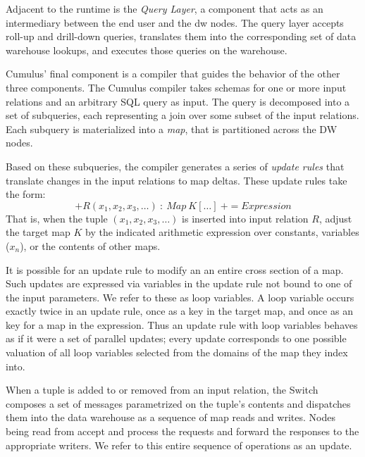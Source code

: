 \documentclass{sig-alternate}
\begin{document}
Adjacent to the runtime is the \textit{Query Layer}, a component that acts as an intermediary between the end user and the dw nodes.  The query layer accepts roll-up and drill-down queries, translates them into the corresponding set of data warehouse lookups, and executes those queries on the warehouse.

Cumulus' final component is a compiler that guides the behavior of the other three components.  The Cumulus compiler takes schemas for one or more input relations and an arbitrary SQL query as input.  The query is decomposed into a set of subqueries, each representing a join over some subset of the input relations.  Each subquery is materialized into a \textit{map}, that is partitioned across the DW nodes.  

Based on these subqueries, the compiler generates a series of \textit{update rules} that translate changes in the input relations to map deltas.  These update rules take the form:
$$+R(x_1, x_2, x_3, \ldots)\ :\ Map\ K[\ldots]\ += Expression$$
That is, when the tuple $(x_1, x_2, x_3, \ldots)$ is inserted into input relation $R$, adjust the target map $K$ by the indicated arithmetic expression over constants, variables ($x_n$), or the contents of other maps.  
 
It is possible for an update rule to modify an an entire cross section of a map.  Such updates are expressed via variables in the update rule not bound to one of the input parameters.  We refer to these as loop variables.  A loop variable occurs exactly twice in an update rule, once as a key in the target map, and once as an key for a map in the expression.  Thus an update rule with loop variables behaves as if it were a set of parallel updates; every update corresponds to one possible valuation of all loop variables selected from the domains of the map they index into.

When a tuple is added to or removed from an input relation, the Switch composes a set of messages parametrized on the tuple's contents and dispatches them into the data warehouse as a sequence of map reads and writes.  Nodes being read from accept and process the requests and forward the responses to the appropriate writers.  We refer to this entire sequence of operations as an update.
\end{document}
